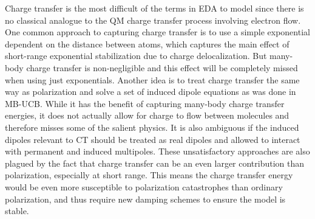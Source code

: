 \documentclass[journal=jctcce,manuscript=article]{achemso}
\begin{document}
Charge transfer is the most difficult of the terms in EDA to model since there is no classical analogue to the QM charge transfer process involving electron flow.\cite{herman2023accurate} One common approach to capturing charge transfer is to use a simple exponential dependent on the distance between atoms\cite{rackers2021polarizable}, which captures the main effect of short-range exponential stabilization due to charge delocalization. But many-body charge transfer is non-negligible and this effect will be completely missed when using just exponentials. Another idea is to treat charge transfer the same way as polarization and solve a set of induced dipole equations as was done in MB-UCB.\cite{das2019development,wang2023general} While it has the benefit of capturing many-body charge transfer energies, it does not actually allow for charge to flow between molecules and therefore misses some of the salient physics. It is also ambiguous if the induced dipoles relevant to CT should be treated as real dipoles and allowed to interact  with permanent and induced multipoles. These unsatisfactory approaches are also plagued by the fact that charge transfer can be an even larger contribution than polarization, especially at short range. This means the charge transfer energy would be even more susceptible to polarization catastrophes than ordinary polarization, and thus require new damping schemes to ensure the model is stable.
\end{document}
